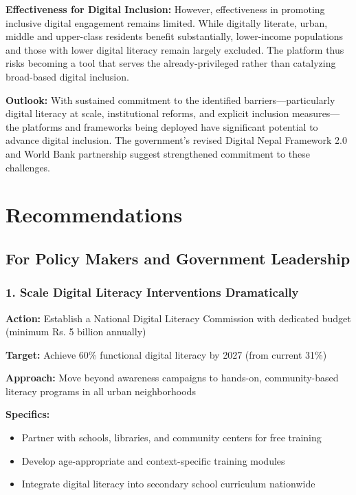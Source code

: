 \documentclass[12pt,a4paper]{article}
\begin{document}
\textbf{Effectiveness for Digital Inclusion:} However, effectiveness in promoting inclusive digital engagement remains limited. While digitally literate, urban, middle and upper-class residents benefit substantially, lower-income populations and those with lower digital literacy remain largely excluded. The platform thus risks becoming a tool that serves the already-privileged rather than catalyzing broad-based digital inclusion.

\textbf{Outlook:} With sustained commitment to the identified barriers—particularly digital literacy at scale, institutional reforms, and explicit inclusion measures—the platforms and frameworks being deployed have significant potential to advance digital inclusion. The government's revised Digital Nepal Framework 2.0 and World Bank partnership suggest strengthened commitment to these challenges.

\newpage
\section{Recommendations}
\label{sec:recommendations}

\subsection{For Policy Makers and Government Leadership}

\subsubsection{1. Scale Digital Literacy Interventions Dramatically}

\textbf{Action:} Establish a National Digital Literacy Commission with dedicated budget (minimum Rs. 5 billion annually)

\textbf{Target:} Achieve 60\% functional digital literacy by 2027 (from current 31\%)

\textbf{Approach:} Move beyond awareness campaigns to hands-on, community-based literacy programs in all urban neighborhoods

\textbf{Specifics:}
\begin{itemize}
    \item Partner with schools, libraries, and community centers for free training
    \item Develop age-appropriate and context-specific training modules
    \item Integrate digital literacy into secondary school curriculum nationwide
\end{itemize}
\end{document}
